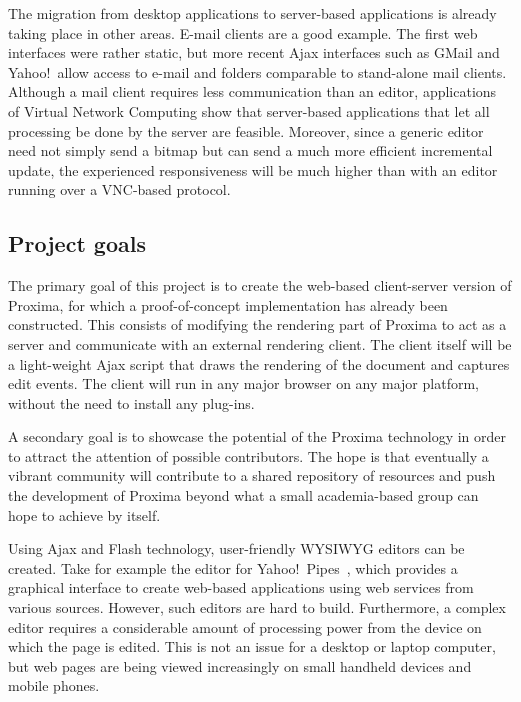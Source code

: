 \documentclass[10pt]{article}
\begin{document}

The migration from desktop applications to server-based applications is already taking place in other areas. E-mail clients are a good example. The first web interfaces were rather static, but more recent Ajax interfaces such as GMail and Yahoo!\ allow access to e-mail and folders comparable to stand-alone mail clients. Although a mail client requires less communication than an editor, applications of Virtual Network Computing show that server-based applications that let all processing be done by the server are feasible. Moreover, since a generic editor need not simply send a bitmap but can send a much more efficient incremental update, the experienced responsiveness will be much higher than with an editor running over a VNC-based protocol.

\subsection{Project goals}

The primary goal of this project is to create the web-based client-server version of Proxima, for which a proof-of-concept implementation has already been constructed. This consists of modifying the rendering part of Proxima to act as a server and communicate with an external rendering client. The client itself will be a light-weight Ajax script that draws the rendering of the document and captures edit events. The client will run in any major browser on any major platform, without the need to install any plug-ins.  

A secondary goal is to showcase the potential of the Proxima technology in order to attract the attention of possible contributors. The hope is that eventually a vibrant community will contribute to a shared repository of resources and push the development of Proxima beyond what a small academia-based group can hope to achieve by itself. 


\bc

Using Ajax and Flash technology, user-friendly WYSIWYG editors can be created. Take for example the editor for Yahoo!\ Pipes~\cite{yahoo08pipes}, which provides a graphical interface to create web-based applications using web services from various sources. However, such editors are hard to build. Furthermore, a complex editor requires a considerable amount of processing power from the device on which the page is edited. This is not an issue for a desktop or laptop computer, but web pages are being viewed increasingly on small handheld devices and mobile phones. 
\end{document}
